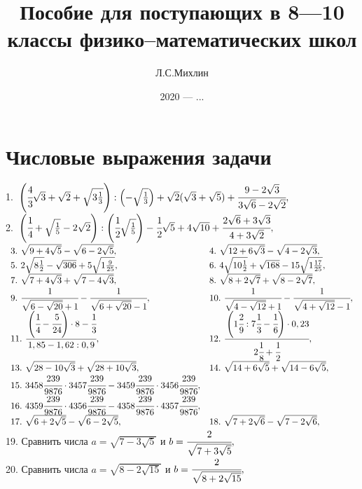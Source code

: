 \documentclass[12pt]{article}
\author{Л.С.Михлин}
\title{Пособие для поступающих в 8---10 классы физико--математических школ}
\date{2020 --- ...}
\begin{document}
\maketitle
\newpage
\tableofcontents
\newpage
\section{Числовые выражения задачи}
1.\ $\left(\cfrac{4}{3}\sqrt{3}+\sqrt{2}+\sqrt{3\frac{1}{3}}\right): \left(-\sqrt{\frac{1}{3}}\right)+\sqrt{2}(\sqrt{3}+\sqrt{5})+\cfrac{9-2\sqrt{3}}{3\sqrt{6}-2\sqrt{2}},$\\
2.\ $\left(\cfrac{1}{4}+\sqrt{\frac{1}{5}}-2\sqrt{2}\right): \left(\cfrac{1}{2}\sqrt{\frac{1}{5}}\right)-\cfrac{1}{2}\sqrt{5}+4\sqrt{10}+\cfrac{2\sqrt{6}+3\sqrt{3}}{4+3\sqrt{2}},$\\
$\begin{array}{ll}
3.\ \sqrt{9+4\sqrt{5}}-\sqrt{6-2\sqrt{5}},&
4.\ \sqrt{12+6\sqrt{3}}-\sqrt{4-2\sqrt{3}},\\
5.\ 2\sqrt{8\frac{1}{2}}-\sqrt{306}+5\sqrt{1\frac{9}{25}},&
6.\ 4\sqrt{10\frac{1}{2}}+\sqrt{168}-15\sqrt{1\frac{17}{25}},\\
7.\ \sqrt{7+4\sqrt{3}}+\sqrt{7-4\sqrt{3}},&
8.\ \sqrt{8+2\sqrt{7}}+\sqrt{8-2\sqrt{7}},\\
9.\ \cfrac{1}{\sqrt{6-\sqrt{20}}+1}-\cfrac{1}{\sqrt{6+\sqrt{20}}-1},&
10.\ \cfrac{1}{\sqrt{4-\sqrt{12}}+1}-\cfrac{1}{\sqrt{4+\sqrt{12}}-1},\\
11.\ \cfrac{\left(\cfrac{1}{4}-\cfrac{5}{24}\right)\cdot 8-\cfrac{1}{3}}{1,85-1,62:0,9},&
12.\ \cfrac{\left(1\cfrac{2}{9}:7\cfrac{1}{3}-\cfrac{1}{6}\right)\cdot0,23}{2\cfrac{1}{8}+\cfrac{1}{2}},\\
13.\ \sqrt{28-10\sqrt{3}}+\sqrt{28+10\sqrt{3}},&
14.\ \sqrt{14+6\sqrt{5}}+\sqrt{14-6\sqrt{5}},\\
15.\ 3458\cfrac{239}{9876}\cdot3457\cfrac{239}{9876}-3459\cfrac{239}{9876}\cdot3456\cfrac{239}{9876},\\
16.\ 4359\cfrac{239}{9876}\cdot4356\cfrac{239}{9876}-4358\cfrac{239}{9876}\cdot4357\cfrac{239}{9876},\\
17.\ \sqrt{6+2\sqrt{5}}-\sqrt{6-2\sqrt{5}},&
18.\ \sqrt{7+2\sqrt{6}}-\sqrt{7-2\sqrt{6}},\\
\end{array}$\\
19. Сравнить числа $a=\sqrt{7-3\sqrt{5}}$ и $b=\cfrac{2}{\sqrt{7+3\sqrt{5}}},$\\
20. Сравнить числа $a=\sqrt{8-2\sqrt{15}}$ и $b=\cfrac{2}{\sqrt{8+2\sqrt{15}}},$\\
\end{document}
